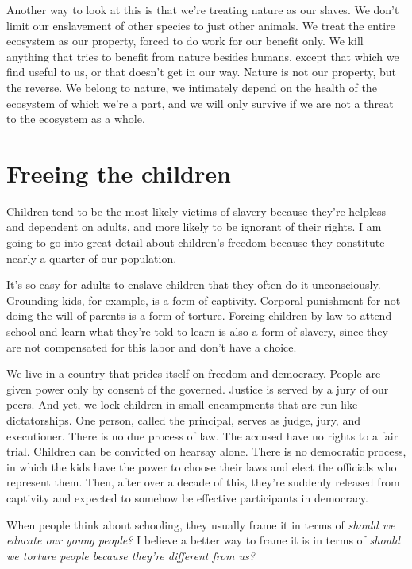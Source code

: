 Another way to look at this is that we're treating nature as our slaves. We don't limit our enslavement of other species to just other animals. We treat the entire ecosystem as our property, forced to do work for our benefit only. We kill anything that tries to benefit from nature besides humans, except that which we find useful to us, or that doesn't get in our way. Nature is not our property, but the reverse. We belong to nature, we intimately depend on the health of the ecosystem of which we're a part, and we will only survive if we are not a threat to the ecosystem as a whole.

\section{Freeing the children}
Children tend to be the most likely victims of slavery because they're helpless and dependent on adults, and more likely to be ignorant of their rights. I am going to go into great detail about children's freedom because they constitute nearly a quarter of our population.\cite{census-quickfacts}

It's so easy for adults to enslave children that they often do it unconsciously. Grounding kids, for example, is a form of captivity. Corporal punishment for not doing the will of parents is a form of torture. Forcing children by law to attend school and learn what they're told to learn is also a form of slavery, since they are not compensated for this labor and don't have a choice.

We live in a country that prides itself on freedom and democracy. People are given power only by consent of the governed. Justice is served by a jury of our peers. And yet, we lock children in small encampments that are run like dictatorships. One person, called the principal, serves as judge, jury, and executioner. There is no due process of law. The accused have no rights to a fair trial. Children can be convicted on hearsay alone. There is no democratic process, in which the kids have the power to choose their laws and elect the officials who represent them. Then, after over a decade of this, they're suddenly released from captivity and expected to somehow be effective participants in democracy.

When people think about schooling, they usually frame it in terms of \emph{should we educate our young people?} I believe a better way to frame it is in terms of \emph{should we torture people because they're different from us?}

